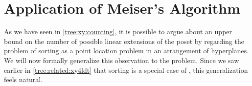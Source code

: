 \chapter{Application of Meiser's Algorithm}

As we have seen in \ref{tree:xy:counting}, it is possible to argue about an
upper bound on the number of possible linear extensions of the poset \XY by
regarding the problem of sorting \XY as a point location problem in an
arrangement of hyperplanes. We will now formally generalize this observation
to the \kSUM problem. Since we saw earlier in \ref{tree:related:xy4ldt} that
sorting \XY is a special case of \fourSUM, this generalization feels natural.
